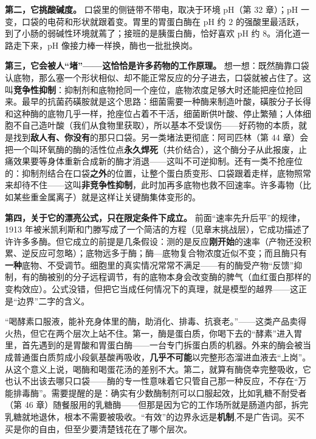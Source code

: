 \textbf{第二，它挑酸碱度。} 口袋里的侧链带不带电，取决于环境 pH（第 32 章）；pH 一变，口袋的电荷和形状就跟着变。胃里的胃蛋白酶在 pH 约 $2$ 的强酸里最活跃，到了小肠的弱碱性环境就蔫了；接班的是胰蛋白酶，恰好喜欢 pH 约 $8$。消化道一路走下来，pH 像接力棒一样换，酶也一批批换岗。

\textbf{第三，它会被人“堵”——这恰恰是许多药物的工作原理。} 想一想：既然酶靠口袋认底物，那么塞一个形状相似、却不能正常反应的分子进去，口袋就被占住了。这叫\textbf{竞争性抑制}：抑制剂和底物抢同一个座位，底物浓度足够大时还能把座位抢回来。最早的抗菌药磺胺就是这个思路：细菌需要一种酶来制造叶酸，磺胺分子长得和这种酶的底物几乎一样，抢座位占着不干活，细菌断供叶酸、停止繁殖；人体细胞不自己造叶酸（我们从食物里获取），所以基本不受误伤——好药物的本质，就是找到\textbf{敌人有、你没有}的那只口袋。另一类堵法更彻底：阿司匹林（第 44 章）会把一个叫环氧酶的酶的活性位点\textbf{永久焊死}（共价结合），这个酶分子从此报废，止痛效果要等身体重新合成新的酶才消退——这叫不可逆抑制。还有一类不抢座位的：抑制剂结合在口袋\textbf{之外}的位置，让整个蛋白质变形、口袋跟着走样，底物照常来却待不住——这叫\textbf{非竞争性抑制}，此时加再多底物也救不回速率。许多毒物（比如某些重金属离子）就是这样让关键酶集体变形的。

\textbf{第四，关于它的漂亮公式，只在限定条件下成立。} 前面“速率先升后平”的规律，1913 年被米凯利斯和门滕写成了一个简洁的方程（见章末挑战层），它成功描述了许许多多酶。但它成立的前提是几条假设：测的是反应\textbf{刚开始}的速率（产物还没积累、逆反应可忽略）；底物远多于酶；酶—底物复合物浓度近似不变；而且酶只有\textbf{一种}底物、不受调节。细胞里的真实情况常常不满足——有的酶受产物“反馈”抑制，有的酶被别的分子远程调节，有的底物本身会改变酶的脾气（血红蛋白那样的变构效应）。公式没错，但把它当成任何情况下的真理，就是模型的越界——这正是“边界”二字的含义。

\begin{wuqu}
“喝酵素口服液，能补充身体里的酶，助消化、排毒、抗衰老。”——这类产品卖得火热，但它在两个层次上站不住。第一，酶是蛋白质，你喝下去的“酵素”进入胃里，首先遇到的是胃酸和胃蛋白酶——一台专门拆蛋白质的机器。外来的酶会被当成普通蛋白质剪成小段氨基酸再吸收，\textbf{几乎不可能}以完整形态溜进血液去“上岗”。从这个意义上说，喝酶和喝蛋花汤的差别不大。第二，就算有酶侥幸完整吸收，它也认不出该去哪只口袋——酶的专一性意味着它只管自己那一种反应，不存在“万能排毒酶”。需要提醒的是：确实有少数酶制剂可以口服起效，比如乳糖不耐受者（第 46 章）随餐服用的乳糖酶——但那是因为它的工作场所就是肠道内部，拆完乳糖就地退休，根本不需要被吸收。“有效”的边界永远是\textbf{机制},不是广告词。买不买是你的自由，但至少要清楚钱花在了哪个层次。
\end{wuqu}

